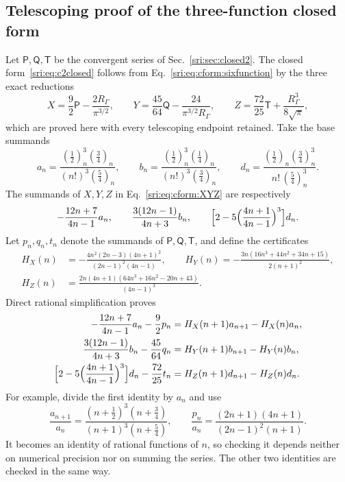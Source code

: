 \subsection{Telescoping proof of the three-function closed form}\label{sri:app:cform:telescoping}
Let $\mathsf P,\mathsf Q,\mathsf T$ be the convergent series of Sec.~\ref{sri:sec:closed2}. The closed
form~\eqref{sri:eq:c2closed} follows from Eq.~\eqref{sri:eq:cform:sixfunction} by the three exact reductions
\begin{equation}
 X=\frac92\mathsf P-\frac{2R_\Gamma}{\pi^{3/2}},\qquad
 Y=\frac{45}{64}\mathsf Q-\frac{24}{\pi^{3/2}R_\Gamma},\qquad
 Z=\frac{72}{25}\mathsf T+\frac{R_\Gamma^3}{8\sqrt\pi},
 \label{sri:eq:cform:XYZfinal}
\end{equation}
which are proved here with every telescoping endpoint retained. Take the base summands
\begin{equation}
 a_n=\frac{(\frac12)_n^3(\frac34)_n}{(n!)^3(\frac54)_n},\qquad
 b_n=\frac{(\frac12)_n^3(\frac14)_n}{(n!)^3(\frac34)_n},\qquad
 d_n=\frac{(\frac12)_n(\frac34)_n^3}{n!\,(\frac54)_n^3}.
\end{equation}
The summands of $X,Y,Z$ in Eq.~\eqref{sri:eq:cform:XYZ} are respectively
\begin{equation}
 -\frac{12n+7}{4n-1}a_n,\qquad\frac{3(12n-1)}{4n+3}b_n,\qquad
 \Bigl[2-5\Bigl(\frac{4n+1}{4n-1}\Bigr)^3\Bigr]d_n.
\end{equation}
Let $p_n,q_n,t_n$ denote the summands of $\mathsf P,\mathsf Q,\mathsf T$, and define the certificates
\begin{equation}
\begin{aligned}
 H_X(n)&=-\frac{4n^2(2n-3)(4n+1)^2}{(2n-1)^2(4n-1)},\qquad
 H_Y(n)=-\frac{3n(16n^3+44n^2+34n+15)}{2(n+1)^2},\\
 H_Z(n)&=\frac{2n(4n+1)(64n^3+16n^2-20n+43)}{(4n-1)^3}.
\end{aligned}
\end{equation}
Direct rational simplification proves
\begin{equation}
\begin{aligned}
 -\frac{12n+7}{4n-1}a_n-\frac92p_n&=H_X(n+1)a_{n+1}-H_X(n)a_n,\\
 \frac{3(12n-1)}{4n+3}b_n-\frac{45}{64}q_n&=H_Y(n+1)b_{n+1}-H_Y(n)b_n,\\
 \Bigl[2-5\Bigl(\frac{4n+1}{4n-1}\Bigr)^3\Bigr]d_n-\frac{72}{25}t_n&=H_Z(n+1)d_{n+1}-H_Z(n)d_n.
\end{aligned}
 \label{sri:eq:cform:telescoping}
\end{equation}
For example, divide the first identity by $a_n$ and use
\begin{equation}
 \frac{a_{n+1}}{a_n}=\frac{(n+\frac12)^3(n+\frac34)}{(n+1)^3(n+\frac54)},\qquad
 \frac{p_n}{a_n}=\frac{(2n+1)(4n+1)}{(2n-1)^2(n+1)}.
\end{equation}
It becomes an identity of rational functions of $n$, so checking it depends neither on numerical precision nor on
summing the series. The other two identities are checked in the same way.

